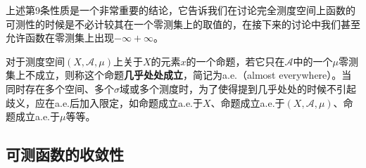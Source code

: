 \begin{note}
	上述第9条性质是一个非常重要的结论，它告诉我们在讨论完全测度空间上函数的可测性的时候是不必计较其在一个零测集上的取值的，在接下来的讨论中我们甚至允许函数在零测集上出现$-\infty+\infty$。
\end{note}
\begin{definition}
	对于测度空间$(X,\mathscr{A},\mu)$上关于$X$的元素$x$的一个命题，若它只在$\mathscr{A}$中的一个$\mu$零测集上不成立，则称这个命题\textbf{几乎处处成立}，简记为a.e.（almost everywhere）。当同时存在多个空间、多个$\sigma$域或多个测度时，为了使得提到几乎处处的时候不引起歧义，应在a.e.后加入限定，如命题成立a.e.于$X$、命题成立a.e.于$(X,\mathscr{A},\mu)$、命题成立a.e.于$\mu$等等。
\end{definition}

\subsection{可测函数的收敛性}
